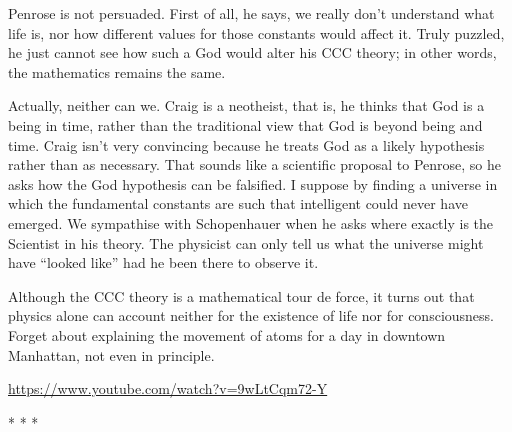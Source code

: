 Penrose is not persuaded. First of all, he says, we really don't understand what life is, nor how different values for those constants would affect it. Truly puzzled, he just cannot see how such a God would alter his CCC theory; in other words, the mathematics remains the same.

Actually, neither can we. Craig is a neotheist, that is, he thinks that God is a being in time, rather than the traditional view that God is beyond being and time. Craig isn't very convincing because he treats God as a likely hypothesis rather than as necessary. That sounds like a scientific proposal to Penrose, so he asks how the God hypothesis can be falsified. I suppose by finding a universe in which the fundamental constants are such that intelligent could never have emerged. We sympathise with Schopenhauer when he asks where exactly is the Scientist in his theory. The physicist can only tell us what the universe might have ``looked like'' had he been there to observe it.

Although the CCC theory is a mathematical tour de force, it turns out that physics alone can account neither for the existence of life nor for consciousness. Forget about explaining the movement of atoms for a day in downtown Manhattan, not even in principle.

\url{https://www.youtube.com/watch?v=9wLtCqm72-Y} 


\begin{center}* * *\end{center}


